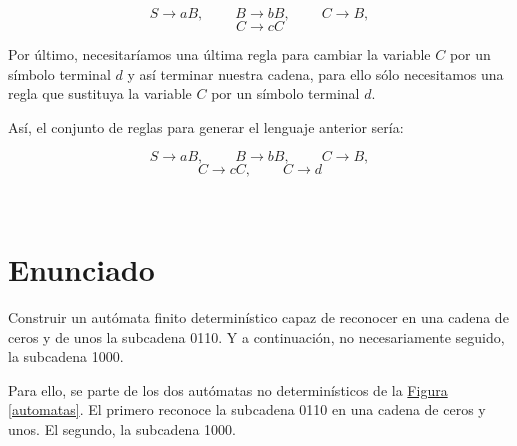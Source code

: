 \documentclass[10pt,a4paper,spanish]{report}
\begin{document}
\begin{displaymath}
S \rightarrow aB, \qquad\ B \rightarrow bB, \qquad\ C \rightarrow B,
\end{displaymath}
\begin{displaymath}
C \rightarrow cC
\end{displaymath}

Por último, necesitaríamos una última regla para cambiar la variable $C$ por un símbolo terminal $d$ y así terminar nuestra cadena, para ello sólo necesitamos una regla que sustituya la variable $C$ por un símbolo terminal $d$.

Así, el conjunto de reglas para generar el lenguaje anterior sería:

\begin{displaymath}
S \rightarrow aB, \qquad\ B \rightarrow bB, \qquad\ C \rightarrow B,
\end{displaymath}
\begin{displaymath}
C \rightarrow cC, \qquad\ C \rightarrow d
\end{displaymath}

\newpage

\thispagestyle{empty}

\\[3cm]

\section{\textcolor{p3}Enunciado}
Construir un autómata finito determinístico capaz de reconocer en una cadena de ceros y de unos la subcadena 0110. Y a continuación, no necesariamente seguido, la subcadena 1000. 

Para ello, se parte de los dos autómatas no determinísticos de la \hyperref[automatas]{Figura \ref*{automatas}}. El primero reconoce la subcadena 0110 en una cadena de ceros y unos. El segundo, la subcadena 1000.
\end{document}
